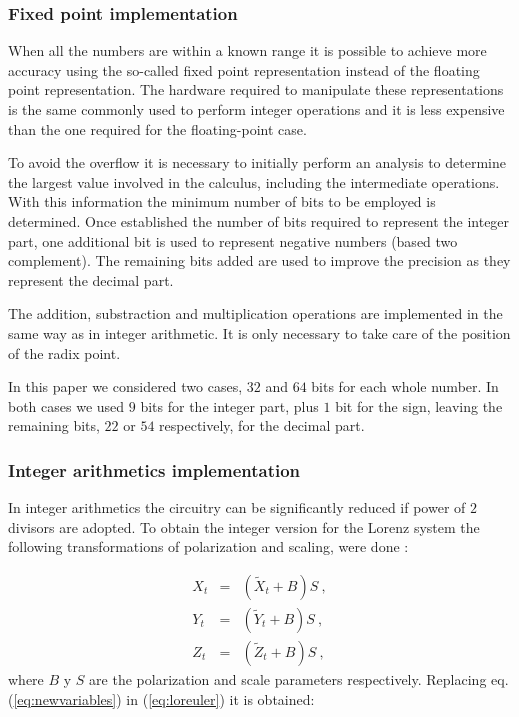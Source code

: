 \subsubsection{Fixed point implementation}
\label{sec:impleFix} When all the numbers are within a known range
it is possible to achieve more accuracy using the so-called fixed
point representation instead of the floating point representation.
The hardware required to manipulate these representations is the
same commonly used to perform integer operations and it is less
expensive than the one required for the floating-point case.

To avoid the overflow it is necessary to initially perform an
analysis to determine the largest value involved in the calculus,
including the intermediate operations. With this information the
minimum number of bits to be employed is determined. Once
established the number of bits required to represent the integer
part, one additional bit is used to represent negative numbers
(based two complement). The remaining bits added are used to
improve the precision as they represent the decimal part.

The addition, substraction and multiplication operations are
implemented in the same way as in integer arithmetic. It is only
necessary to take care of the position of the radix point.

In this paper we considered two cases, $32$ and $64$ bits for each
whole number. In both cases we used $9$ bits for the integer part,
plus $1$ bit for the sign, leaving the remaining bits, $22$ or $54$ respectively,
for the decimal part.
\subsubsection{Integer arithmetics implementation}
\label{sec:impleInt}

In integer arithmetics the circuitry can be significantly reduced
if power of $2$ divisors are adopted. To obtain the integer version for the Lorenz system
the following transformations of polarization and scaling, were done
\cite{Gonzalez2003}:

\begin{eqnarray} \label{eq:newvariables}
{X}_{t}&=&\left({\widetilde X}_{t} + B\right)S \ , \nonumber \\
{Y}_{t}&=&\left({\widetilde Y}_{t} + B\right)S \ , \\
{Z}_{t}&=&\left({\widetilde Z}_{t} + B\right)S \ , \nonumber
\end{eqnarray}
%
where $B$ y $S$ are the polarization and scale parameters
respectively. Replacing eq. (\ref{eq:newvariables}) in
(\ref{eq:loreuler}) it is obtained:
%

